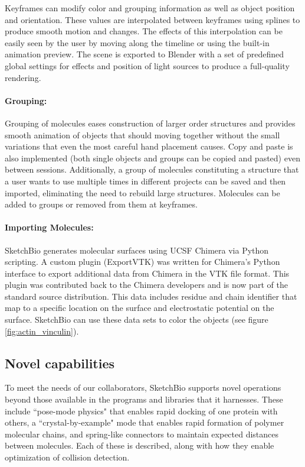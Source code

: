 \documentclass[twocolumn]{bmcart}%
\begin{document}
Keyframes can modify color and grouping information as well as object position and orientation.
These values are interpolated between keyframes using splines to produce smooth motion and changes.
The effects of this interpolation can be easily seen by the user by moving along the timeline or using the built-in animation preview.
The scene is exported to Blender with a set of predefined global settings for effects and position of light sources to produce a full-quality rendering.

\paragraph*{Grouping:}
Grouping of molecules eases construction of larger order structures and provides smooth animation of objects that should moving together without the small variations that even the most careful hand placement causes.
Copy and paste is also implemented (both single objects and groups can be copied and pasted) even between sessions. Additionally, a group of molecules constituting a structure that a user wants to use multiple times in different projects can be saved and then imported, eliminating the need to rebuild large structures.
Molecules can be added to groups or removed from them at keyframes.

\paragraph*{Importing Molecules:}
SketchBio generates molecular surfaces using UCSF Chimera via Python scripting.
A custom plugin (ExportVTK) was written for Chimera's Python interface to export additional data from Chimera in the VTK file format.
This plugin was contributed back to the Chimera developers and is now part of the standard source distribution.
This data includes residue and chain identifier that map to a specific location on the surface and electrostatic potential on the surface.
SketchBio can use these data sets to color the objects (see figure \ref{fig:actin_vinculin}).

\subsection*{Novel capabilities}

To meet the needs of our collaborators, SketchBio supports novel operations beyond those available in the programs and libraries that it harnesses.
These include ``pose-mode physics" that enables rapid docking of one protein with others, a ``crystal-by-example" mode that enables rapid formation of polymer molecular chains, and spring-like connectors to maintain expected distances between molecules.
Each of these is described, along with how they enable optimization of collision detection.
\end{document}
